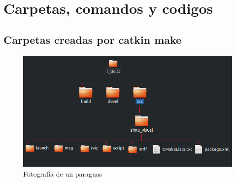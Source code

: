 \chapter{Carpetas, comandos y codigos}\label{anexoC}
\thispagestyle{fancy}
    \section{Carpetas creadas por catkin make}
        \begin{figure}[H]
              \centering
	          \includegraphics[width=1.0\linewidth]{Back/image_anexo/catkin_make.png}
              \caption{Fotografía de un paraguas}
              \label{f:Cap4_Metodo_B_Modelacion_Dinamica_2}
        \end{figure}
    \newpage

